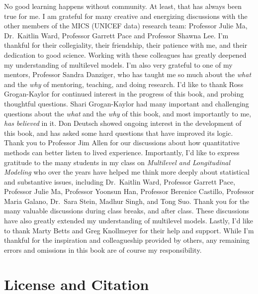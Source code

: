 \documentclass[
  letterpaper,
  DIV=11,
  numbers=noendperiod]{scrreprt}
\begin{document}

No good learning happens without community. At least, that has always
been true for me. I am grateful for many creative and energizing
discussions with the other members of the MICS (UNICEF data) research
team: Professor Julie Ma, Dr.~Kaitlin Ward, Professor Garrett Pace and
Professor Shawna Lee. I'm thankful for their collegiality, their
friendship, their patience with me, and their dedication to good
science. Working with these colleagues has greatly deepened my
understanding of multilevel models. I'm also very grateful to one of my
mentors, Professor Sandra Danziger, who has taught me so much about the
\emph{what} and the \emph{why} of mentoring, teaching, and doing
research. I'd like to thank Ross Grogan-Kaylor for continued interest in
the progress of this book, and probing thoughtful questions. Shari
Grogan-Kaylor had many important and challenging questions about the
\emph{what} and the \emph{why} of this book, and most importantly to me,
\emph{has believed} in it. Don Deutsch showed ongoing interest in the
development of this book, and has asked some hard questions that have
improved its logic. Thank you to Professor Jim Allen for our discussions
about how quantitative methods can better listen to lived experience.
Importantly, I'd like to express gratitude to the many students in my
class on \emph{Multilevel and Longitudinal Modeling} who over the years
have helped me think more deeply about statistical and substantive
issues, including Dr.~Kaitlin Ward, Professor Garrett Pace, Professor
Julie Ma, Professor Yoonsun Han, Professor Berenice Castillo, Professor
Maria Galano, Dr.~Sara Stein, Madhur Singh, and Tong Suo. Thank you for
the many valuable discussions during class breaks, and after class.
These discussions have also greatly extended my understanding of
multilevel models. Lastly, I'd like to thank Marty Betts and Greg
Knollmeyer for their help and support. While I'm thankful for the
inspiration and colleagueship provided by others, any remaining errors
and omissions in this book are of course my responsibility.


\chapter*{License and Citation}\label{license-and-citation}

\end{document}
